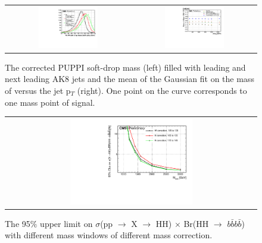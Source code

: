 \begin{figure}[t]
  \centering
  \begin{tabular}{cc}
    \includegraphics[width=0.5\textwidth]{Figures/ap1/j01.pdf}  &
    \includegraphics[width=0.5\textwidth]{Figures/ap1/MassMean_both.pdf} \\
  \end{tabular}
  \caption{The corrected PUPPI soft-drop mass (left) filled with leading and next leading AK8 jets and the mean of the Gaussian fit on the mass of versus the jet p$_{T}$ (right). One point on the curve corresponds to one mass point of signal.}
  \label{fig:hvt_brs}
\end{figure}

\begin{figure}[t]
  \centering
  \begin{tabular}{c}
    \includegraphics[width=0.5\textwidth]{Figures/ap1/Limit2.pdf} 
  \end{tabular}
  \caption{The 95$\% $ upper limit on $\sigma$(pp $\rightarrow$ X $\rightarrow$ HH) $\times$ Br(HH $\rightarrow$ $b\bar{b}b\bar{b}$) with different mass windows of different mass correction.}
  \label{fig:hvt_brs}
\end{figure}
